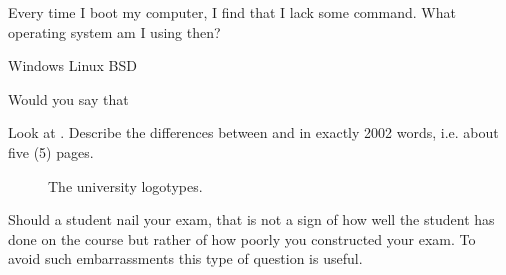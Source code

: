 \documentclass[a4paper,addpoints]{miunexam}
\begin{document}
\begin{questions}
	\question[1]\label{q:WindowsVsUNIX}
	Every time I boot my computer, I find that I lack some command.
	What operating system am I using then?
	\begin{oneparchoices}
		\CorrectChoice Windows
		\choice Linux
		\choice BSD
	\end{oneparchoices}

	\question
	Would you say that

	\question[10]
	Look at .
	Describe the differences between  and
	 in exactly 2002 words, i.e. about five
	(5) pages.

	\begin{figure}[p]
		\centering
		\ifpdf
		\else
		\fi
		\caption{The university logotypes.}
		\label{fig:Logos}
	\end{figure}
	
	\begin{solution}
		Should a student nail your exam, that is not a sign of how well the
		student has done on the course but rather of how poorly you constructed
		your exam.
		To avoid such embarrassments this type of question is useful.
	\end{solution}


\end{questions}
\end{document}
